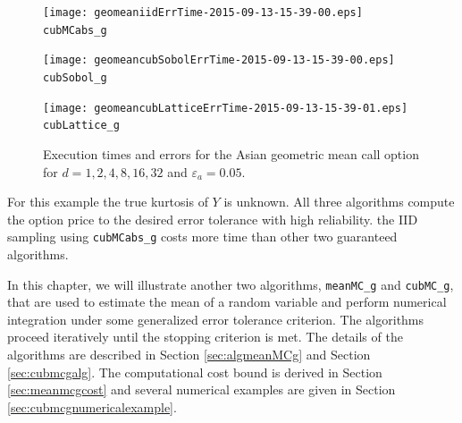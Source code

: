 \documentclass{iitthesis}
\theoremstyle{definition}
\begin{document}
\begin{figure}
\centering
\begin{minipage}{9cm} \centering \texttt{[image: geomeaniidErrTime-2015-09-13-15-39-00.eps]} \\ {\tt cubMCabs\_g} \end{minipage}
\begin{minipage}{7cm} \centering \texttt{[image: geomeancubSobolErrTime-2015-09-13-15-39-00.eps]} \\ {\tt cubSobol\_g} \end{minipage}
\begin{minipage}{7cm} \centering \texttt{[image: geomeancubLatticeErrTime-2015-09-13-15-39-01.eps]} \\ {\tt cubLattice\_g} \end{minipage}
\caption{Execution times and errors for the Asian geometric mean call option for $d=1, 2, 4, 8, 16, 32$ and $\varepsilon_a=0.05$.\label{fig:GeoMeanAsianOptionabstol}}
\end{figure}

For this example the true kurtosis of $Y$ is unknown.  
All three algorithms compute the option price to the desired error tolerance with high reliability.  the IID sampling using {\tt cubMCabs\_g} costs more time than other two guaranteed algorithms.


\label{chapter:meanMCg}

In this chapter, we will illustrate another two algorithms, {\tt meanMC\_g} and {\tt cubMC\_g}, that are used to estimate the mean of a random variable and perform numerical integration under some generalized error tolerance criterion. The algorithms proceed iteratively until the stopping criterion is met. The details of the algorithms are described in Section \ref{sec:algmeanMCg} and Section \ref{sec:cubmcgalg}. The computational cost bound is derived in Section \ref{sec:meanmcgcost} and several numerical examples are given in Section \ref{sec:cubmcgnumericalexample}.

\label{sec:generalerrorcriterion}
\end{document}
